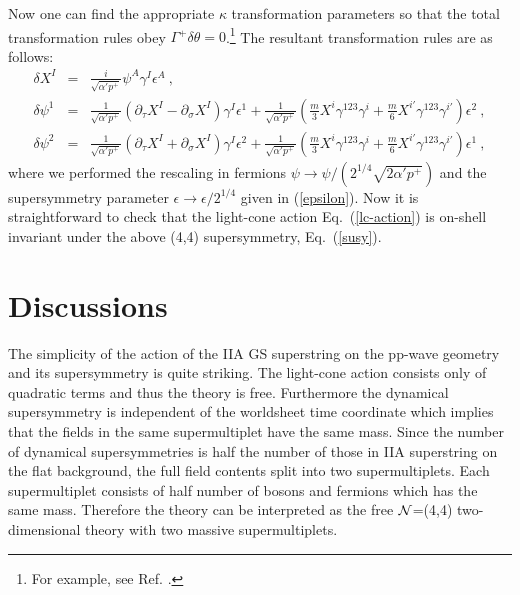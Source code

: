 \documentclass[a4paper,12pt]{article}
\begin{document}
Now one can find the appropriate $\kappa$ transformation parameters so
that the total transformation rules obey $\Gamma^+\delta
\theta=0$.\footnote{For example, see Ref. \cite{hyu247}.} The
resultant transformation rules are as follows:
\begin{eqnarray}
\delta X^I &=& \frac{i}{\sqrt{\alpha' p^+}} 
                \psi^A \gamma^I \epsilon^A  ~,   \nonumber \\
\delta \psi^1 &=&
  \frac{1}{\sqrt{\alpha' p^+}} 
        (\partial_\tau X^I-\partial_\sigma X^I) 
        \gamma^I \epsilon^1
 +\frac{1}{\sqrt{\alpha' p^+}} 
        \left( \frac{m}{3} X^i \gamma^{123} \gamma^i 
              +\frac{m}{6} X^{i'} \gamma^{123} \gamma^{i'}
        \right) \epsilon^2 ~,
                                                \nonumber \\
\delta \psi^2 &=&
  \frac{1}{\sqrt{\alpha' p^+}} 
        (\partial_\tau X^I + \partial_\sigma X^I) 
        \gamma^I \epsilon^2
 +\frac{1}{\sqrt{\alpha' p^+}} 
        \left( \frac{m}{3} X^i \gamma^{123} \gamma^i 
              +\frac{m}{6} X^{i'} \gamma^{123} \gamma^{i'}
        \right) \epsilon^1 ~,
\label{susy}
\end{eqnarray}                  
where we performed the rescaling in fermions $\psi \rightarrow \psi /
(2^{1/4} \sqrt{2 \alpha' p^+})$ and the supersymmetry parameter
$\epsilon \rightarrow \epsilon / 2^{1/4}$ given in
(\ref{epsilon}). Now it is straightforward to check that the
light-cone action Eq.~(\ref{lc-action}) is on-shell invariant under the
above (4,4) supersymmetry, Eq.~(\ref{susy}).




\section{Discussions}

The simplicity of the action of the IIA GS superstring on the pp-wave
geometry and its supersymmetry is quite striking. The light-cone
action consists only of quadratic terms and thus the theory is
free. Furthermore the dynamical supersymmetry is independent of the
worldsheet time coordinate which implies that the fields in the same
supermultiplet have the same mass.  Since the number of dynamical
supersymmetries is half the number of those in IIA superstring on the
flat background, the full field contents split into two
supermultiplets. Each supermultiplet consists of half number of bosons
and fermions which has the same mass. Therefore the theory can be
interpreted as the free $\cal{N}$=(4,4) two-dimensional theory with
two massive supermultiplets.
\end{document}
